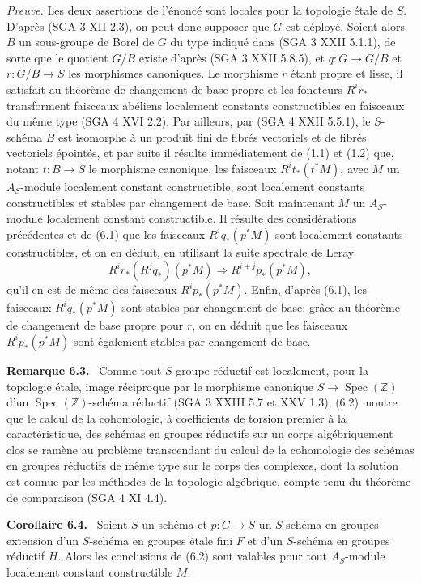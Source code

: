 \documentclass[11pt]{article}
\newenvironment{statement}[1]{\par\medskip\noindent\textbf{#1.}\ }{\par\medskip}
\begin{document}
\emph{Preuve.} Les deux assertions de l'énoncé sont locales pour la topologie étale de $S$. D'après (SGA 3 XII 2.3), on peut donc supposer que $G$ est déployé. Soient alors $B$ un sous-groupe de Borel de $G$ du type indiqué dans (SGA 3 XXII 5.1.1), de sorte que le quotient $G/B$ existe d'après (SGA 3 XXII 5.8.5), et $q:G\to G/B$ et $r:G/B\to S$ les morphismes canoniques. Le morphisme $r$ étant propre et lisse, il satisfait au théorème de changement de base propre et les foncteurs $R^ir_*$ transforment faisceaux abéliens localement constants constructibles en faisceaux du même type (SGA 4 XVI 2.2). Par ailleurs, par (SGA 4 XXII 5.5.1), le $S$-schéma $B$ est isomorphe à un produit fini de fibrés vectoriels et de fibrés vectoriels épointés, et par suite il résulte immédiatement de (1.1) et (1.2) que, notant $t:B\to S$ le morphisme canonique, les faisceaux $R^it_*(t^*M)$, avec $M$ un $A_S$-module localement constant constructible, sont localement constants constructibles et stables par changement de base. Soit maintenant $M$ un $A_S$-module localement constant constructible. Il résulte des considérations précédentes et de (6.1) que les faisceaux $R^iq_*(p^*M)$ sont localement constants constructibles, et on en déduit, en utilisant la suite spectrale de Leray
\[
R^ir_*(R^jq_*)(p^*M)\Rightarrow R^{i+j}p_*(p^*M),
\]
qu'il en est de même des faisceaux $R^ip_*(p^*M)$. Enfin, d'après (6.1), les faisceaux $R^iq_*(p^*M)$ sont stables par changement de base; grâce au théorème de changement de base propre pour $r$, on en déduit que les faisceaux $R^ip_*(p^*M)$ sont également stables par changement de base.

\begin{statement}{Remarque 6.3}
Comme tout $S$-groupe réductif est localement, pour la topologie étale, image réciproque par le morphisme canonique $S\to\operatorname{Spec}(\mathbb Z)$ d'un $\operatorname{Spec}(\mathbb Z)$-schéma réductif (SGA 3 XXIII 5.7 et XXV 1.3), (6.2) montre que le calcul de la cohomologie, à coefficients de torsion premier à la caractéristique, des schémas en groupes réductifs sur un corps algébriquement clos se ramène au problème transcendant du calcul de la cohomologie des schémas en groupes réductifs de même type sur le corps des complexes, dont la solution est connue par les méthodes de la topologie algébrique, compte tenu du théorème de comparaison (SGA 4 XI 4.4).
\end{statement}

\begin{statement}{Corollaire 6.4}
Soient $S$ un schéma et $p:G\to S$ un $S$-schéma en groupes extension d'un $S$-schéma en groupes étale fini $F$ et d'un $S$-schéma en groupes réductif $H$. Alors les conclusions de (6.2) sont valables pour tout $A_S$-module localement constant constructible $M$.
\end{statement}
\end{document}
